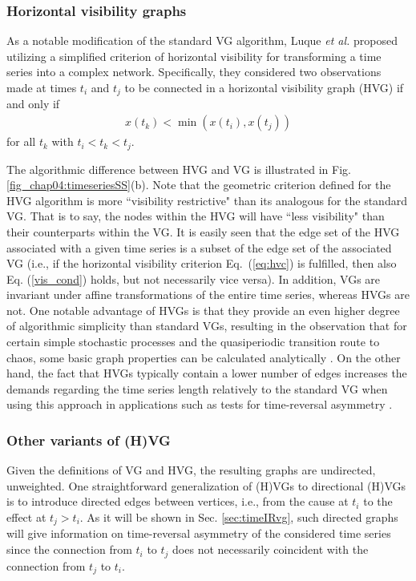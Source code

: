 		\subsubsection{Horizontal visibility graphs}
		As a notable modification of the standard VG algorithm, Luque \textit{et al.} \cite{Luque2009} proposed utilizing a simplified criterion of horizontal visibility for transforming a time series into a complex network. Specifically, they considered two observations made at times $t_i$ and $t_j$ to be connected in a horizontal visibility graph (HVG) if and only if
\begin{align}
x(t_k) < \min \left( x \left(t_i \right), x \left(t_j \right) \right) \label{eq:hvc}
\end{align}
for all $t_k$ with $t_i<t_k<t_j$. 

		The algorithmic difference between HVG and VG is illustrated in Fig. \ref{fig_chap04:timeseriesSS}(b). Note that the geometric criterion defined for the HVG algorithm is more ``visibility restrictive" than its analogous for the standard VG. That is to say, the nodes within the HVG will have ``less visibility" than their counterparts within the VG. It is easily seen that the edge set of the HVG associated with a given time series is a subset of the edge set of the associated VG (i.e., if the horizontal visibility criterion Eq.~(\ref{eq:hvc}) is fulfilled, then also Eq. (\ref{vis_cond}) holds, but not necessarily vice versa). In addition, VGs are invariant under affine transformations of the entire time series, whereas HVGs are not. One notable advantage of HVGs is that they provide an even higher degree of algorithmic simplicity than standard VGs, resulting in the observation that for certain simple stochastic processes and the quasiperiodic transition route to chaos, some basic graph properties can be calculated analytically \citep{Luque2009,Luque2013a,Luque2013d}. On the other hand, the fact that HVGs typically contain a lower number of edges increases the demands regarding the time series length relatively to the standard VG when using this approach in applications such as tests for time-reversal asymmetry \citep{Donges2013}. 
		
		\subsubsection{Other variants of (H)VG}
		Given the definitions of VG and HVG, the resulting graphs are undirected, unweighted. One straightforward generalization of (H)VGs to directional (H)VGs is to introduce directed edges between vertices, i.e., from the cause at $t_i$ to the effect at $t_j > t_i$. As it will be shown in Sec. \ref{sec:timeIRvg}, such directed graphs will give information on time-reversal asymmetry of the considered time series since the connection from $t_i$ to $t_j$ does not necessarily coincident with the connection from $t_j$ to $t_i$. 
		

